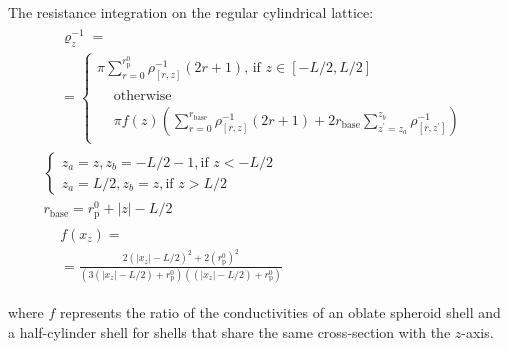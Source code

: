 \documentclass[10pt, a4paper]{article}
\begin{document}
\begin{multicols}{2}
The resistance integration on the regular cylindrical lattice:
\begin{gather}
    \label{eq:r_z_num}
    \begin{aligned} 
        &\varrho_{z}^{-1} =
        \\
        &=\begin{cases}
             \pi \sum_{r=0}^{r_{\text{p}}^{0}} \rho^{-1}_{[r,z]} (2r+1) \text{, if } z\in[-L/2,L/2]
             \\[4pt]
             \begin{aligned}
                &\text{otherwise}
                \\
                &\pi f(z) \left(\sum_{r=0}^{r_{\text{base}}} \rho^{-1}_{[r,z]} (2r+1) + 2 r_{\text{base}} \sum_{z^{\prime} = z_{a}}^{z_{b}}\rho^{-1}_{[r,z^{\prime}]}\right)
             \end{aligned}
        \end{cases}
    \end{aligned}
    \\
    \begin{cases}
        z_{a} = z, z_{b} = -L/2-1, \text{if } z < -L/2
        \\
        z_{a} = L/2, z_{b} = z, \text{if } z > L/2
    \end{cases}
    \\
    \label{eq:r_base}
    r_{\text{base}} = r_{\text{p}}^{0} + |z| - L/2
    \\
    \label{eq:prefactor}
    \begin{aligned}
        &f(x_z) =\\
        & = \frac{2(|x_z|-L/2)^2 + 2(r_{\text{p}}^{0})^2}{(3(|x_z|-L/2)+r_{\text{p}}^{0})((|x_z|-L/2)+r_{\text{p}}^{0})}
    \end{aligned}
\end{gather}

where $f$ represents the ratio of the conductivities of an oblate spheroid shell and a half-cylinder shell for shells that share the same cross-section with the $z$-axis.


\end{multicols}
\end{document}
